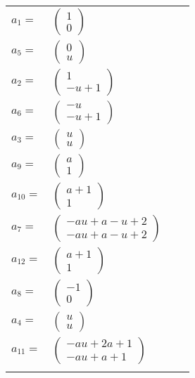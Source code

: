 \documentclass[1p]{elsarticle_modified}
\theoremstyle{definition}
\begin{document}
\begin{tabular}{m{7pt} m{180pt} m{7pt} m{180pt} }
\flushright $a_{1}=$&$\begin{pmatrix}1\\0\end{pmatrix}$ \\
\flushright $a_{5}=$&$\begin{pmatrix}0\\u\end{pmatrix}$ \\
\flushright $a_{2}=$&$\begin{pmatrix}1\\- u+1\end{pmatrix}$ \\
\flushright $a_{6}=$&$\begin{pmatrix}- u\\- u+1\end{pmatrix}$ \\
\flushright $a_{3}=$&$\begin{pmatrix}u\\u\end{pmatrix}$ \\
\flushright $a_{9}=$&$\begin{pmatrix}a\\1\end{pmatrix}$ \\
\flushright $a_{10}=$&$\begin{pmatrix}a+1\\1\end{pmatrix}$ \\
\flushright $a_{7}=$&$\begin{pmatrix}- a u+a- u+2\\- a u+a- u+2\end{pmatrix}$ \\
\flushright $a_{12}=$&$\begin{pmatrix}a+1\\1\end{pmatrix}$ \\
\flushright $a_{8}=$&$\begin{pmatrix}-1\\0\end{pmatrix}$ \\
\flushright $a_{4}=$&$\begin{pmatrix}u\\u\end{pmatrix}$ \\
\flushright $a_{11}=$&$\begin{pmatrix}- a u+2 a+1\\- a u+a+1\end{pmatrix}$\\&\end{tabular}
\end{document}
